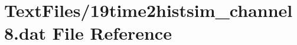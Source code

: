 \hypertarget{19time2histsim__channel8_8dat}{}\section{Text\+Files/19time2histsim\+\_\+channel8.dat File Reference}
\label{19time2histsim__channel8_8dat}
